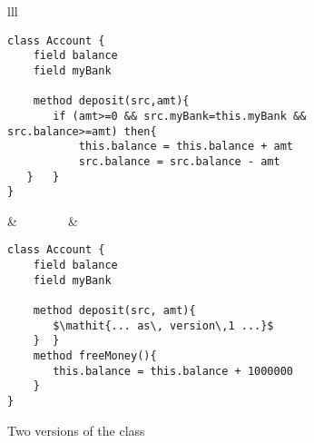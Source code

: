   \vspace*{-0.2cm}
 \begin{figure}[htb]
 \begin{tabular}{lll} %
\begin{minipage}{0.45\textwidth}
\begin{lstlisting}
class Account {
    field balance
    field myBank
    
    method deposit(src,amt){
       if (amt>=0 && src.myBank=this.myBank && src.balance>=amt) then{
           this.balance = this.balance + amt
           src.balance = src.balance - amt
   }   }
}
\end{lstlisting}
\end{minipage}
  &\ \ \  \ \ \ \ \  &
\begin{minipage}{0.45\textwidth}
\begin{lstlisting}
class Account {
    field balance
    field myBank
    
    method deposit(src, amt){
       $\mathit{... as\, version\,1 ...}$          
    }  }     
    method freeMoney(){
       this.balance = this.balance + 1000000
    }
}
\end{lstlisting}
\end{minipage} 
 \end{tabular}
  \vspace*{-0.95cm}
  \caption{Two versions of the class }
 \label{fig:ExampleBank}
 \end{figure}
 

